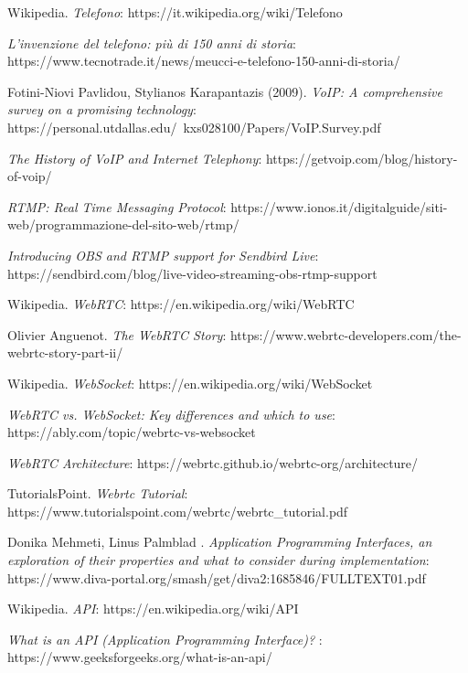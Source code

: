 \documentclass[11pt, a4paper, openany]{book}
\newcommand\blankpage{%
	\null
	\thispagestyle{empty}%
	\addtocounter{page}{-1}%
	\newpage}
\begin{document}
 	\afterpage{\blankpage}
 	
 	\begin{thebibliography}{9}
 		Wikipedia. \emph{Telefono}: https://it.wikipedia.org/wiki/Telefono
 		
 		\emph{L’invenzione del telefono: più di 150 anni di storia}: https://www.tecnotrade.it/news/meucci-e-telefono-150-anni-di-storia/
 		
 		Fotini-Niovi Pavlidou, Stylianos Karapantazis (2009). \emph{VoIP: A comprehensive survey on a promising technology}: https://personal.utdallas.edu/~kxs028100/Papers/VoIP.Survey.pdf
 		
 		\emph{The History of VoIP and Internet Telephony}: https://getvoip.com/blog/history-of-voip/
 		
 		\emph{RTMP: Real Time Messaging Protocol}: https://www.ionos.it/digitalguide/siti-web/programmazione-del-sito-web/rtmp/
 		
 		\emph{Introducing OBS and RTMP support for Sendbird Live}: https://sendbird.com/blog/live-video-streaming-obs-rtmp-support
 		
 		Wikipedia. \emph{WebRTC}: https://en.wikipedia.org/wiki/WebRTC
 		
 		Olivier Anguenot. \emph{The WebRTC Story}: https://www.webrtc-developers.com/the-webrtc-story-part-ii/
 		
 		Wikipedia. \emph{WebSocket}: https://en.wikipedia.org/wiki/WebSocket
 	
 		\emph{WebRTC vs. WebSocket: Key differences and which to use}: https://ably.com/topic/webrtc-vs-websocket
 		
 		\emph{WebRTC Architecture}: https://webrtc.github.io/webrtc-org/architecture/
 		
 		TutorialsPoint. \emph{Webrtc Tutorial}: https://www.tutorialspoint.com/webrtc/webrtc\_tutorial.pdf
 		
 		Donika Mehmeti, Linus Palmblad . \emph{Application Programming Interfaces, an exploration of their properties and what to consider during implementation}: https://www.diva-portal.org/smash/get/diva2:1685846/FULLTEXT01.pdf
 		
 		Wikipedia. \emph{API}: https://en.wikipedia.org/wiki/API
 		
 		\emph{What is an API (Application Programming Interface)?} : https://www.geeksforgeeks.org/what-is-an-api/
 		

\end{thebibliography}
\end{document}
